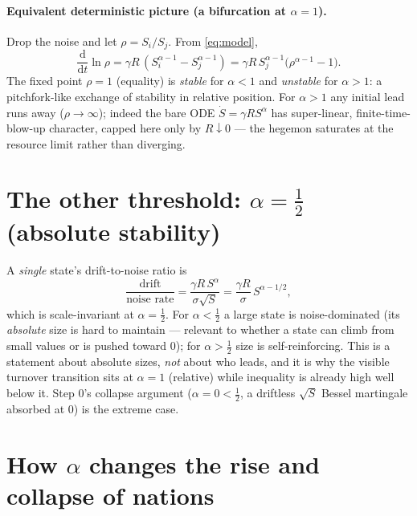\documentclass[11pt]{article}
\newcommand{\dd}{\mathrm{d}}
\begin{document}
\paragraph{Equivalent deterministic picture (a bifurcation at $\alpha=1$).} Drop
the noise and let $\rho=S_i/S_j$. From \eqref{eq:model},
\begin{equation}
\frac{\dd}{\dd t}\ln\rho=\gamma R\,(S_i^{\alpha-1}-S_j^{\alpha-1})
=\gamma R\,S_j^{\alpha-1}\big(\rho^{\alpha-1}-1\big).
\end{equation}
The fixed point $\rho=1$ (equality) is \emph{stable} for $\alpha<1$ and
\emph{unstable} for $\alpha>1$: a pitchfork-like exchange of stability in relative
position. For $\alpha>1$ any initial lead runs away ($\rho\to\infty$); indeed the
bare ODE $\dot S=\gamma R S^\alpha$ has super-linear, finite-time-blow-up
character, capped here only by $R\downarrow0$ — the hegemon saturates at the
resource limit rather than diverging.

\section{The other threshold: $\alpha=\tfrac12$ (absolute stability)}

A \emph{single} state's drift-to-noise ratio is
\begin{equation}
\frac{\text{drift}}{\text{noise rate}}=\frac{\gamma R\,S^{\alpha}}{\sigma\sqrt S}
=\frac{\gamma R}{\sigma}\,S^{\alpha-1/2},
\end{equation}
which is scale-invariant at $\alpha=\tfrac12$. For $\alpha<\tfrac12$ a large state
is noise-dominated (its \emph{absolute} size is hard to maintain — relevant to
whether a state can climb from small values or is pushed toward $0$); for
$\alpha>\tfrac12$ size is self-reinforcing. This is a statement about absolute
sizes, \emph{not} about who leads, and it is why the visible turnover transition
sits at $\alpha=1$ (relative) while inequality is already high well below it.
Step 0's collapse argument ($\alpha=0<\tfrac12$, a driftless $\sqrt S$ Bessel
martingale absorbed at $0$) is the extreme case.

\section{How $\alpha$ changes the rise and collapse of nations}
\end{document}
